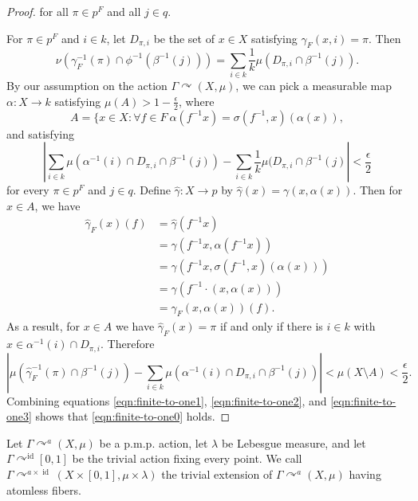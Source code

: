 \documentclass[12pt]{amsart}
\theoremstyle{definition}
\DeclareMathOperator{\id}{id}
\newcommand{\pmp}{p{$.$}m{$.$}p{$.$}}
\newcommand{\acts}{\curvearrowright}
\begin{document}
\begin{proof}
for all $\pi \in p^F$ and all $j \in q$.

For $\pi \in p^F$ and $i \in k$, let $D_{\pi,i}$ be the set of $x \in X$ satisfying $\gamma_F(x,i) = \pi$. Then
\begin{equation} \label{eqn:finite-to-one1}
\nu(\gamma_F^{-1}(\pi) \cap \phi^{-1}(\beta^{-1}(j))) = \sum_{i \in k} \frac{1}{k} \mu(D_{\pi,i} \cap \beta^{-1}(j)).
\end{equation}
By our assumption on the action $\Gamma \acts (X, \mu)$, we can pick a measurable map $\alpha : X \rightarrow k$ satisfying $\mu(A) > 1 - \frac{\epsilon}{2}$, where
\[A = \{x \in X : \forall f \in F \ \alpha(f^{-1} x) = \sigma(f^{-1}, x)(\alpha(x)),\]
and satisfying
\begin{equation} \label{eqn:finite-to-one2}
\left| \sum_{i \in k} \mu(\alpha^{-1}(i) \cap D_{\pi,i} \cap \beta^{-1}(j)) - \sum_{i \in k} \frac{1}{k} \mu(D_{\pi, i} \cap \beta^{-1}(j) \right| < \frac{\epsilon}{2}
\end{equation}
for every $\pi \in p^F$ and $j \in q$. Define $\hat{\gamma} : X \rightarrow p$ by $\hat{\gamma}(x) = \gamma(x, \alpha(x))$. Then for $x \in A$, we have
\begin{align*}
    \hat{\gamma}_F(x)(f) & = \hat{\gamma}(f^{-1} x)\\
    & = \gamma(f^{-1} x, \alpha(f^{-1} x))\\
    & = \gamma(f^{-1} x, \sigma(f^{-1},x)(\alpha(x)))\\
    & = \gamma(f^{-1} \cdot (x, \alpha(x)))\\
    & = \gamma_F(x,\alpha(x))(f).
\end{align*}
As a result, for $x \in A$ we have $\hat{\gamma}_F(x) = \pi$ if and only if there is $i \in k$ with $x \in \alpha^{-1}(i) \cap D_{\pi, i}$. Therefore
\begin{equation} \label{eqn:finite-to-one3}
\left|\mu(\hat{\gamma}_F^{-1}(\pi) \cap \beta^{-1}(j)) - \sum_{i \in k} \mu(\alpha^{-1}(i) \cap D_{\pi,i} \cap \beta^{-1}(j)) \right| < \mu(X \setminus A) < \frac{\epsilon}{2}.
\end{equation}
Combining equations \eqref{eqn:finite-to-one1}, \eqref{eqn:finite-to-one2}, and \eqref{eqn:finite-to-one3} shows that \eqref{eqn:finite-to-one0} holds.
\end{proof}

Let $\Gamma \acts^a (X, \mu)$ be a {\pmp} action, let $\lambda$ be Lebesgue measure, and let $\Gamma \acts^{\id} [0,1]$ be the trivial action fixing every point. We call $\Gamma \acts^{a \times \id} (X \times [0,1], \mu \times \lambda)$ the trivial extension of $\Gamma \acts^a (X, \mu)$ having atomless fibers.
\end{document}
